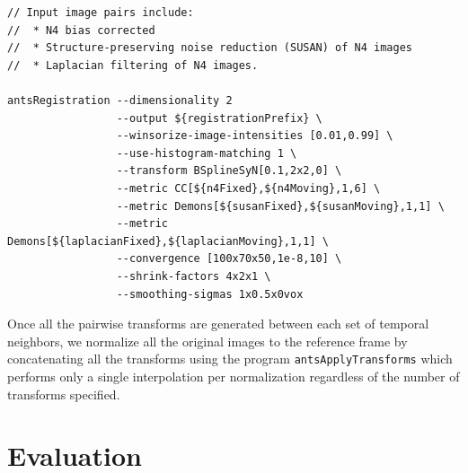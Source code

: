 \documentclass{llncs}
\begin{document}
\begin{lstlisting}
// Input image pairs include:
//  * N4 bias corrected
//  * Structure-preserving noise reduction (SUSAN) of N4 images
//  * Laplacian filtering of N4 images.

antsRegistration --dimensionality 2 
                 --output ${registrationPrefix} \
                 --winsorize-image-intensities [0.01,0.99] \
                 --use-histogram-matching 1 \
                 --transform BSplineSyN[0.1,2x2,0] \
                 --metric CC[${n4Fixed},${n4Moving},1,6] \
                 --metric Demons[${susanFixed},${susanMoving},1,1] \
                 --metric Demons[${laplacianFixed},${laplacianMoving},1,1] \
                 --convergence [100x70x50,1e-8,10] \
                 --shrink-factors 4x2x1 \
                 --smoothing-sigmas 1x0.5x0vox
\end{lstlisting}

Once all the pairwise transforms are generated between each set of temporal 
neighbors, we normalize all the original images to the reference frame
by concatenating all the transforms using the program {\tt antsApplyTransforms}
which performs only a single interpolation per normalization regardless of
the number of transforms specified.

\section{Evaluation}
\end{document}
